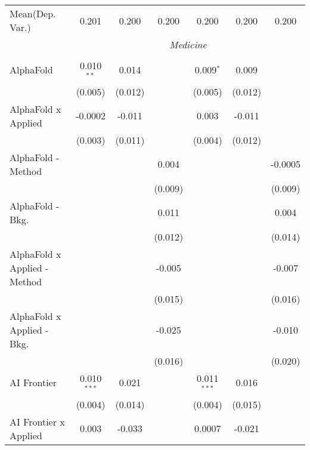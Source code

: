 \begin{tabular}{lcccccc}
Mean(Dep. Var.) & 0.201 & 0.200 & 0.200 & 0.200 & 0.200 & 0.200 \\
 & \multicolumn{6}{c}{\textit{Medicine}} \\ \\
   AlphaFold                      & 0.010$^{**}$  & 0.014         &               & 0.009$^{*}$   & 0.009         &   \\   
                                  & (0.005)       & (0.012)       &               & (0.005)       & (0.012)       &   \\   
   AlphaFold x Applied            & -0.0002       & -0.011        &               & 0.003         & -0.011        &   \\   
                                  & (0.003)       & (0.011)       &               & (0.004)       & (0.012)       &   \\   
   AlphaFold - Method             &               &               & 0.004         &               &               & -0.0005\\   
                                  &               &               & (0.009)       &               &               & (0.009)\\   
   AlphaFold - Bkg.               &               &               & 0.011         &               &               & 0.004\\   
                                  &               &               & (0.012)       &               &               & (0.014)\\   
   AlphaFold x Applied - Method   &               &               & -0.005        &               &               & -0.007\\   
                                  &               &               & (0.015)       &               &               & (0.016)\\   
   AlphaFold x Applied - Bkg.     &               &               & -0.025        &               &               & -0.010\\   
                                  &               &               & (0.016)       &               &               & (0.020)\\   
   AI Frontier                    & 0.010$^{***}$ & 0.021         &               & 0.011$^{***}$ & 0.016         &   \\   
                                  & (0.004)       & (0.014)       &               & (0.004)       & (0.015)       &   \\   
   AI Frontier x Applied          & 0.003         & -0.033        &               & 0.0007        & -0.021        &   \\   

\end{tabular}
